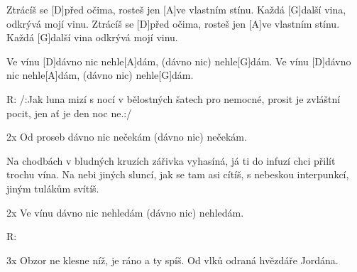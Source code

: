 
Ztrácíš se [D]před očima, rosteš jen [A]ve vlastním stínu.
Každá [G]další vina, odkrývá mojí vinu.
Ztrácíš se [D]před očima, rosteš jen [A]ve vlastním stínu.
Každá [G]další vina odkrývá mojí vinu.

Ve vínu [D]dávno nic nehle[A]dám, (dávno nic) nehle[G]dám.
Ve vínu [D]dávno nic nehle[A]dám, (dávno nic) nehle[G]dám.

R:
/:Jak luna mizí s nocí v bělostných šatech pro nemocné,
prosit je zvláštní pocit, jen ať je den noc ne.:/

2x Od proseb dávno nic nečekám (dávno nic) nečekám.

Na chodbách v bludných kruzích zářivka vyhasíná,
já ti do infuzí chci přilít trochu vína.
Na nebi jiných sluncí, jak se tam asi cítíš,
s nebeskou interpunkcí, jiným tulákům svítíš.

2x Ve vínu dávno nic nehledám (dávno nic) nehledám.

R:

3x Obzor ne klesne níž, je ráno a ty spíš.
Od vlků odraná hvězdáře Jordána.
